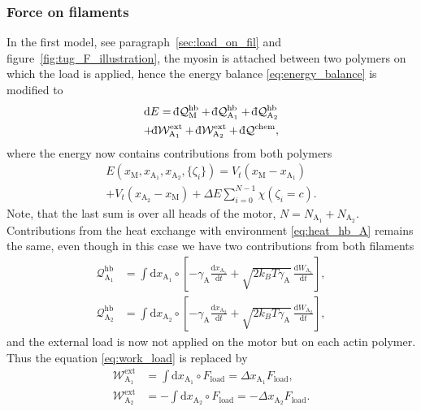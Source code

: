 \documentclass[aps,pre,twocolumn,showpacs,showkeys,superscriptaddress,floatfix]{revtex4-1}
\newcommand{\rmd}{{\mathrm d}}
\newcommand{\dbar}{{\mathchar '26 \mkern-11mu {\mathrm d}}}
\begin{document}
\subsubsection{Force on filaments}
In the first model, see paragraph~\ref{sec:load_on_fil} and figure~\ref{fig:tug_F_illustration},
the myosin is attached between two polymers on which the load is applied, 
hence the energy balance \eqref{eq:energy_balance} is modified to  
\begin{multline}
\rmd E = \dbar {\mathcal Q}_\text{M}^\text{hb} + \dbar {\mathcal Q}_{\text{A}_1}^\text{hb} + \dbar {\mathcal Q}_{\text{A}_2}^\text{hb} 
\\
+ \dbar {\mathcal W}^\text{ext}_{\text{A}_1} + \dbar {\mathcal W}^\text{ext}_{\text{A}_2} + \dbar {\mathcal Q}^\text{chem}, 
\label{eq:energy_balance_two_filaments}
\end{multline}
where the energy now contains contributions from both polymers
\begin{multline*}
E( x_\text{M}, x_{\text{A}_1}, x_{\text{A}_2}, \{ \zeta_i \}) 
= V_t( x_\text{M} - x_{\text{A}_1} ) 
\\
+ V_t( x_{\text{A}_2} - x_\text{M} ) 
+ \Delta E \sum\limits_{i=0}^{N-1} \chi( \zeta_i = c ) .
\end{multline*}
Note, that the last sum is over all heads of the motor, $N = N_{\text{A}_1} + N_{\text{A}_2}$.
Contributions from the heat exchange with environment \eqref{eq:heat_hb_A} remains the same, even though in this case we have two contributions from both filaments
\begin{align*}
{\mathcal Q}_{\text{A}_1}^\text{hb} 
&= \int \rmd x_{\text{A}_1} \circ \left[ - \gamma_\text{A} \frac{\rmd x_{\text{A}_1} }{\rmd t} + \sqrt{ 2 k_B T \gamma_\text{A} } \, \frac{ \rmd W_{\text{A}_1} }{ \rmd t } \right] , \\ 
{\mathcal Q}_{\text{A}_2}^\text{hb} 
&= \int \rmd x_{\text{A}_2} \circ \left[ - \gamma_\text{A} \frac{\rmd x_{\text{A}_2} }{\rmd t} + \sqrt{ 2 k_B T \gamma_\text{A} } \, \frac{ \rmd W_{\text{A}_2} }{ \rmd t } \right] ,
\end{align*}
and the external load is now not applied on the motor but on each actin polymer.
Thus the equation \eqref{eq:work_load} is replaced by 
\begin{align*}
{\mathcal W}^\text{ext}_{\text{A}_1} &= \int \rmd x_{\text{A}_1} \circ F_\text{load} = \Delta x_{\text{A}_1} F_\text{load}, 
\\
{\mathcal W}^\text{ext}_{\text{A}_2} &= - \int \rmd x_{\text{A}_2} \circ F_\text{load} = - \Delta x_{\text{A}_2} F_\text{load}. 
\end{align*}
\end{document}
